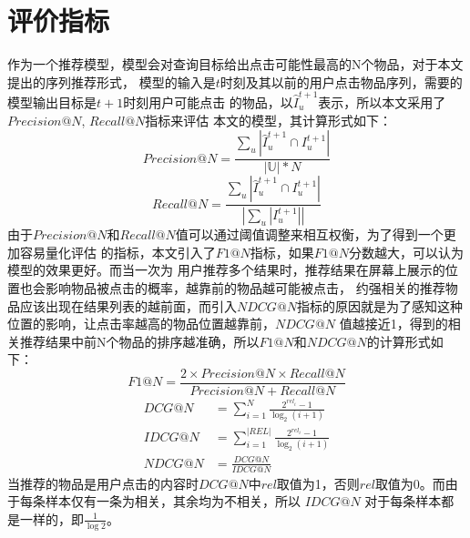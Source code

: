 \section{评价指标}
作为一个推荐模型，模型会对查询目标给出点击可能性最高的N个物品，对于本文提出的序列推荐形式，%
模型的输入是$t$时刻及其以前的用户点击物品序列，需要的模型输出目标是$t+1$时刻用户可能点击%
的物品，以$\hat{I}_{u}^{t+1}$表示，所以本文采用了$Precision@N$, $Recall@N$指标来评估%
本文的模型，其计算形式如下：
\begin{equation}
Precision@N=\frac{\sum_{u}|\hat{I}_{u}^{t+1}\cap I_{u}^{t+1} |}{\left | \mathbb{U} \right |*N}
\end{equation}
\begin{equation}
Recall@N=\frac{\sum_{u}|\hat{I}_{u}^{t+1}\cap I_{u}^{t+1} |}{\left |\sum_{u}|I_{u}^{t+1}| \right |}
\end{equation}
由于$Precision@N$和$Recall@N$值可以通过阈值调整来相互权衡，为了得到一个更加容易量化评估%
的指标，本文引入了$F1@N$指标，如果$F1@N$分数越大，可以认为模型的效果更好。而当一次为%
用户推荐多个结果时，推荐结果在屏幕上展示的位置也会影响物品被点击的概率，越靠前的物品越可能被点击，%
约强相关的推荐物品应该出现在结果列表的越前面，而引入$NDCG@N$指标的原因就是为了感知这种%
位置的影响，让点击率越高的物品位置越靠前，$NDCG@N$%
值越接近1，得到的相关推荐结果中前N个物品的排序越准确，所以$F1@N$和$NDCG@N$的计算形式如下：
\begin{equation}
F1@N=\frac{2\times Precision@N\times Recall@N}{Precision@N+Recall@N}
\end{equation}
\begin{equation}
  \begin{aligned}
  DCG@N &= \sum_{i=1}^{N} \frac{2^{rel_{i}}-1}{\log _{2}(i+1)} \\
  IDCG@N &= \sum_{i=1}^{|REL|} \frac{2^{rel_{i}}-1}{\log _{2}(i+1)} \\
  NDCG@N &= \frac{DCG@N}{IDCG@N}
  \label{E21}
  \end{aligned}
\end{equation}
当推荐的物品是用户点击的内容时$DCG@N$中$rel$取值为1，否则$rel$取值为0。而由于每条样本仅有一条为相关，其余均为不相关，所以 $IDCG@N$ 对于每条样本都是一样的，即$\frac{1}{\log 2}$。


